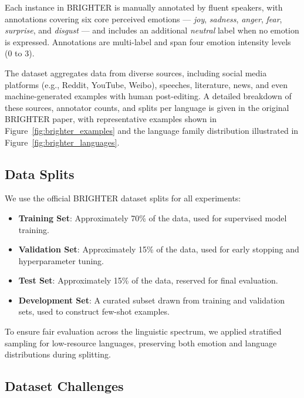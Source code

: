 \documentclass[a4paper,12pt]{extarticle}
\begin{document}
Each instance in BRIGHTER is manually annotated by fluent speakers, with annotations covering six core perceived emotions — \textit{joy}, \textit{sadness}, \textit{anger}, \textit{fear}, \textit{surprise}, and \textit{disgust} — and includes an additional \textit{neutral} label when no emotion is expressed. Annotations are multi-label and span four emotion intensity levels (0 to 3).

The dataset aggregates data from diverse sources, including social media platforms (e.g., Reddit, YouTube, Weibo), speeches, literature, news, and even machine-generated examples with human post-editing. A detailed breakdown of these sources, annotator counts, and splits per language is given in the original BRIGHTER paper, with representative examples shown in Figure~\ref{fig:brighter_examples} and the language family distribution illustrated in Figure~\ref{fig:brighter_languages}.

\subsection{Data Splits}
We use the official BRIGHTER dataset splits for all experiments:

\begin{itemize}
\item \textbf{Training Set}: Approximately 70\% of the data, used for supervised model training.
\item \textbf{Validation Set}: Approximately 15\% of the data, used for early stopping and hyperparameter tuning.
\item \textbf{Test Set}: Approximately 15\% of the data, reserved for final evaluation.
\item \textbf{Development Set}: A curated subset drawn from training and validation sets, used to construct few-shot examples.
\end{itemize}

To ensure fair evaluation across the linguistic spectrum, we applied stratified sampling for low-resource languages, preserving both emotion and language distributions during splitting.

\subsection{Dataset Challenges}
\end{document}
